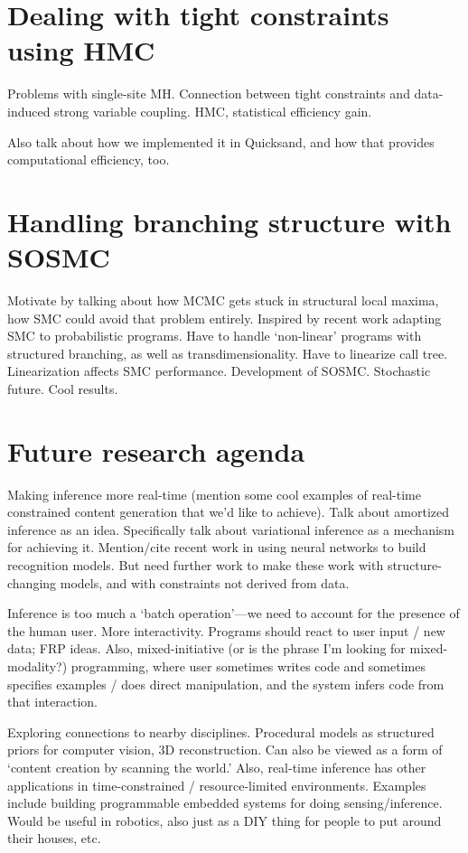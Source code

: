 \documentclass[
11pt, %
a4paper, %
oneside, %
headinclude,footinclude, %
BCOR5mm, %
]{scrartcl}
\begin{document}
\section*{Dealing with tight constraints using HMC}

Problems with single-site MH. Connection between tight constraints and data-induced strong variable coupling. HMC, statistical efficiency gain.

Also talk about how we implemented it in Quicksand, and how that provides computational efficiency, too.

\section*{Handling branching structure with SOSMC}

Motivate by talking about how MCMC gets stuck in structural local maxima, how SMC could avoid that problem entirely. Inspired by recent work adapting SMC to probabilistic programs. Have to handle `non-linear' programs with structured branching, as well as transdimensionality. Have to linearize call tree. Linearization affects SMC performance. Development of SOSMC. Stochastic future. Cool results.


\section*{Future research agenda}

Making inference more real-time (mention some cool examples of real-time constrained content generation that we'd like to achieve). Talk about amortized inference as an idea. Specifically talk about variational inference as a mechanism for achieving it. Mention/cite recent work in using neural networks to build recognition models. But need further work to make these work with structure-changing models, and with constraints not derived from data.

Inference is too much a `batch operation'---we need to account for the presence of the human user. More interactivity. Programs should react to user input / new data; FRP ideas. Also, mixed-initiative (or is the phrase I'm looking for mixed-modality?) programming, where user sometimes writes code and sometimes specifies examples / does direct manipulation, and the system infers code from that interaction.

Exploring connections to nearby disciplines. Procedural models as structured priors for computer vision, 3D reconstruction. Can also be viewed as a form of `content creation by scanning the world.' Also, real-time inference has other applications in time-constrained / resource-limited environments. Examples include building programmable embedded systems for doing sensing/inference. Would be useful in robotics, also just as a DIY thing for people to put around their houses, etc.




\end{document}

